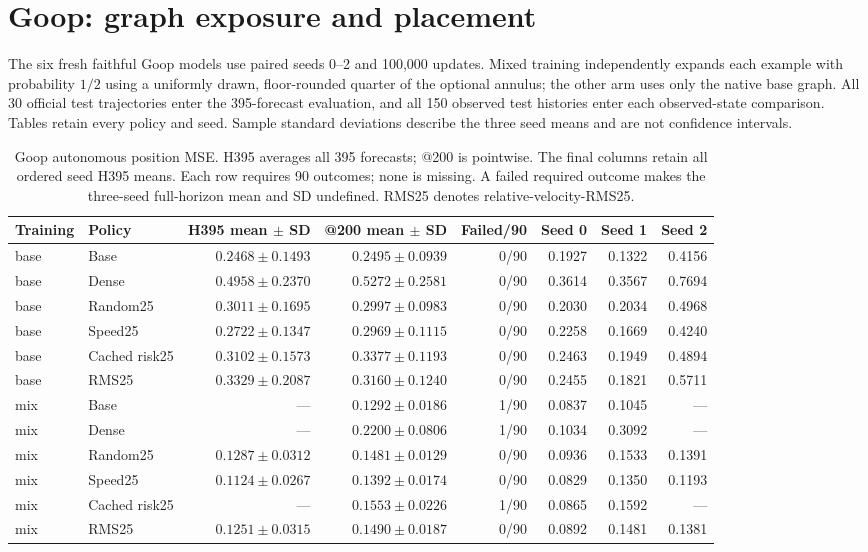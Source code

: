 \section{Goop: graph exposure and placement}
\label{sec:goop-graph-exposure}
The six fresh faithful Goop models use paired seeds 0--2 and 100,000 updates. Mixed training independently expands each example with probability $1/2$ using a uniformly drawn, floor-rounded quarter of the optional annulus; the other arm uses only the native base graph. All 30 official test trajectories enter the 395-forecast evaluation, and all 150 observed test histories enter each observed-state comparison. Tables retain every policy and seed. Sample standard deviations describe the three seed means and are not confidence intervals.

\begin{table}[t]
\centering\scriptsize
\caption{Goop autonomous position MSE. H395 averages all 395 forecasts; @200 is pointwise. The final columns retain all ordered seed H395 means. Each row requires 90 outcomes; none is missing. A failed required outcome makes the three-seed full-horizon mean and SD undefined. RMS25 denotes relative-velocity-RMS25.}
\label{tab:goop-all-rollouts}
\begin{tabular}{llrrrrrr}
\toprule
Training & Policy & H395 mean $\pm$ SD & @200 mean $\pm$ SD & Failed/90 & Seed 0 & Seed 1 & Seed 2\\
\midrule
base & Base & $0.2468\pm0.1493$ & $0.2495\pm0.0939$ & 0/90 & 0.1927 & 0.1322 & 0.4156\\
base & Dense & $0.4958\pm0.2370$ & $0.5272\pm0.2581$ & 0/90 & 0.3614 & 0.3567 & 0.7694\\
base & Random25 & $0.3011\pm0.1695$ & $0.2997\pm0.0983$ & 0/90 & 0.2030 & 0.2034 & 0.4968\\
base & Speed25 & $0.2722\pm0.1347$ & $0.2969\pm0.1115$ & 0/90 & 0.2258 & 0.1669 & 0.4240\\
base & Cached risk25 & $0.3102\pm0.1573$ & $0.3377\pm0.1193$ & 0/90 & 0.2463 & 0.1949 & 0.4894\\
base & RMS25 & $0.3329\pm0.2087$ & $0.3160\pm0.1240$ & 0/90 & 0.2455 & 0.1821 & 0.5711\\
\midrule
mix & Base & --- & $0.1292\pm0.0186$ & 1/90 & 0.0837 & 0.1045 & ---\\
mix & Dense & --- & $0.2200\pm0.0806$ & 1/90 & 0.1034 & 0.3092 & ---\\
mix & Random25 & $0.1287\pm0.0312$ & $0.1481\pm0.0129$ & 0/90 & 0.0936 & 0.1533 & 0.1391\\
mix & Speed25 & $0.1124\pm0.0267$ & $0.1392\pm0.0174$ & 0/90 & 0.0829 & 0.1350 & 0.1193\\
mix & Cached risk25 & --- & $0.1553\pm0.0226$ & 1/90 & 0.0865 & 0.1592 & ---\\
mix & RMS25 & $0.1251\pm0.0315$ & $0.1490\pm0.0187$ & 0/90 & 0.0892 & 0.1481 & 0.1381\\
\bottomrule
\end{tabular}
\end{table}

